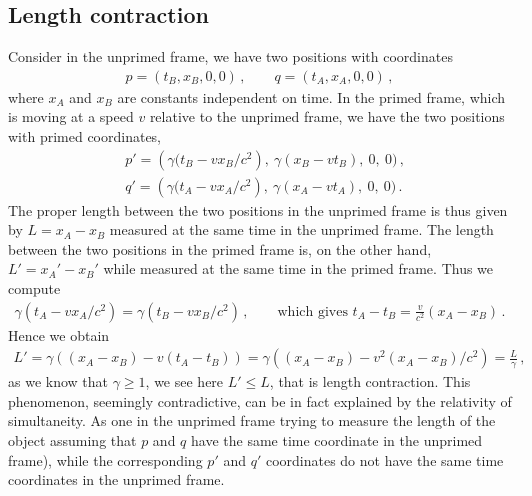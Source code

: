 \documentclass[11pt, onesided]{book}
\theoremstyle{break}
\theoremstyle{break}
\begin{document}
\subsection{Length contraction}
Consider in the unprimed frame, we have two positions with coordinates
\begin{align*}
p = (t_B,x_B,0,0) \,,\qquad q = (t_A,x_A,0,0)\,,
\end{align*}
where $x_A$ and $x_B$ are constants independent on time. In the primed frame, which is moving at a speed $v$ relative to the unprimed frame, we have the two positions with primed coordinates,
\begin{align*}
&p' = \left(\gamma(t_B  - vx_B/c^2\right),\ \gamma\left(x_B-vt_B\right),\ 0,\ 0)\,,\\
&q' = \left(\gamma(t_A  - vx_A/c^2\right),\ \gamma\left(x_A-vt_A\right),\ 0,\ 0)\,.
\end{align*}
The proper length between the two positions in the unprimed frame is thus given by $L=x_A - x_B$ measured at the same time in the unprimed frame. The length between the two positions in the primed frame is, on the other hand, $L' = x_A' - x_B'$ while measured at the same time in the primed frame. Thus we compute
\begin{align*}
\gamma(t_A - vx_A/c^2) = \gamma(t_B - vx_B/c^2) \,,\qquad \text{which gives }t_A - t_B = \frac{v}{c^2}(x_A - x_B)\,.
\end{align*}
Hence we obtain
\begin{align}
L' = \gamma\left( (x_A - x_B) - v(t_A- t_B)\right) = \gamma\left( (x_A - x_B) - v^2(x_A - x_B) /c^2\right) = \frac{L}{\gamma}\,,
\end{align}
as we know that $\gamma \geq 1$, we see here $L' \leq L$, that is length contraction. This phenomenon, seemingly contradictive, can be in fact explained by the relativity of simultaneity. As one in the unprimed frame trying to measure the length of the object assuming that $p$ and $q$ have the same time coordinate in the unprimed frame), while the corresponding $p'$ and $q'$ coordinates do not have the same time coordinates in the unprimed frame. \\
\end{document}
